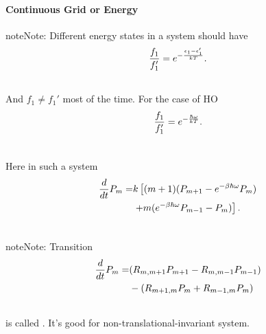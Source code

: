 \documentclass[letterpaper,10pt,english]{sphinxmanual}
\begin{document}
\paragraph{Continuous Grid or Energy}
\label{nonequilibrium/week11:continuous-grid-or-energy}
\begin{notice}{note}{Note:}
Different energy states in a system should have
\begin{gather}
\begin{split}\frac{f_1}{f_1'} = e^{-\frac{\epsilon_1 - \epsilon_1'}{kT}} .\end{split}\notag\\\begin{split}\end{split}\notag
\end{gather}
And $f_1\neq f_1'$ most of the time. For the case of HO
\begin{gather}
\begin{split}\frac{f_1}{f_1'} = e^{-\frac{\hbar \omega}{kT}} .\end{split}\notag\\\begin{split}\end{split}\notag
\end{gather}\end{notice}

Here in such a system
\begin{gather}
\begin{split}\frac{d}{dt}P_m =& k \left[(m+1)(P_{m+1} - e^{-\beta \hbar \omega} P_m)\right. \\
& \left. +m(e^{-\beta \hbar\omega} P_{m-1} - P_m)  \right] .\end{split}\notag\\\begin{split}\end{split}\notag
\end{gather}
\begin{notice}{note}{Note:}
Transition
\begin{gather}
\begin{split}\frac{d}{dt}P_m =& (R_{m,m+1}P_{m+1} -  R_{m,m-1}P_{m-1}) \\
& - (R_{m+1,m}P_m + R_{m-1,m}P_m)\end{split}\notag\\\begin{split}\end{split}\notag
\end{gather}
is called . It's good for non-translational-invariant system.
\end{notice}
\end{document}
